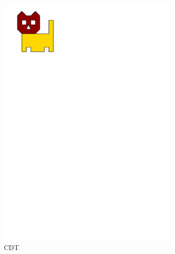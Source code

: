 \begin{figure}
\begin{subfigure}[b]{0.28\linewidth}
    \includegraphics[page=2,width=\linewidth]{figs/tricat.pdf}
    \caption{CDT }\label{fig:pdffig:2}
  \end{subfigure}%
  \qquad %
  \begin{subfigure}[b]{0.28\linewidth}
    \centering

\end{subfigure}
\end{figure}
